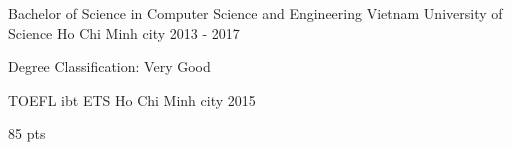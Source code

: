 

\begin{cventries}

  \cventry
    {Bachelor of Science in Computer Science and Engineering} %
    {Vietnam University of Science} %
    {Ho Chi Minh city} %
    {2013 - 2017} %
    {
      \begin{cvitems} %
        \item {Degree Classification: Very Good}
      \end{cvitems}
    }
\cventry
    {TOEFL ibt} %
    {ETS} %
    {Ho Chi Minh city} %
    {2015} %
    {
      \begin{cvitems} %
        \item {85 pts}
      \end{cvitems}
    }

\end{cventries}
